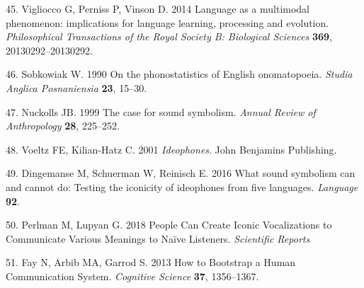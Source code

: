 \documentclass[english,floatsintext,man]{apa6}
\theoremstyle{definition}
\theoremstyle{definition}
\theoremstyle{definition}
\theoremstyle{remark}
\begin{document}
\leavevmode\hypertarget{ref-Vigliocco:2014fc}{}%
45. Vigliocco G, Perniss P, Vinson D. 2014 Language as a multimodal
phenomenon: implications for language learning, processing and
evolution. \emph{Philosophical Transactions of the Royal Society B:
Biological Sciences} \textbf{369}, 20130292--20130292.

\leavevmode\hypertarget{ref-Sobkowiak:1990ph}{}%
46. Sobkowiak W. 1990 On the phonostatistics of English onomatopoeia.
\emph{Studia Anglica Posnaniensia} \textbf{23}, 15--30.

\leavevmode\hypertarget{ref-Nuckolls:1999ca}{}%
47. Nuckolls JB. 1999 The case for sound symbolism. \emph{Annual Review
of Anthropology} \textbf{28}, 225--252.

\leavevmode\hypertarget{ref-Voeltz:2001vv}{}%
48. Voeltz FE, Kilian-Hatz C. 2001 \emph{Ideophones}. John Benjamins
Publishing.

\leavevmode\hypertarget{ref-Dingemanse:2016vd}{}%
49. Dingemanse M, Schuerman W, Reinisch E. 2016 What sound symbolism can
and cannot do: Testing the iconicity of ideophones from five languages.
\emph{Language} \textbf{92}.

\leavevmode\hypertarget{ref-Perlman:2018cs}{}%
50. Perlman M, Lupyan G. 2018 People Can Create Iconic Vocalizations to
Communicate Various Meanings to Naïve Listeners. \emph{Scientific
Reports}

\leavevmode\hypertarget{ref-Fay:2013jpa}{}%
51. Fay N, Arbib MA, Garrod S. 2013 How to Bootstrap a Human
Communication System. \emph{Cognitive Science} \textbf{37}, 1356--1367.


\clearpage
\renewcommand{\listtablename}{Table captions}
\listoftables

\clearpage
\renewcommand{\listfigurename}{Figure captions}
\listoffigures
\end{document}
